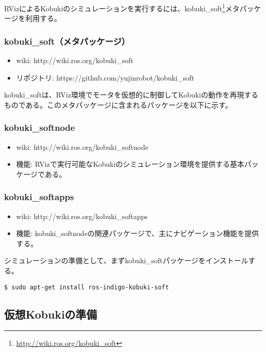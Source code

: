 RVizによるKobukiのシミュレーションを実行するには、kobuki\_soft\footnote{\url{http://wiki.ros.org/kobuki\_soft}}メタパッケージを利用する。

\subsubsection{kobuki\_soft（メタパッケージ）}

\begin{itemize}
\item wiki: http://wiki.ros.org/kobuki\_soft
\item リポジトリ: https://github.com/yujinrobot/kobuki\_soft
\end{itemize}

kobuki\_softは、RViz環境でモータを仮想的に制御してKobukiの動作を再現するものである。このメタパッケージに含まれるパッケージを以下に示す。

\subsubsection{kobuki\_softnode}

\begin{itemize}
\item wiki: http://wiki.ros.org/kobuki\_softnode
\item 機能: RVizで実行可能なKobukiのシミュレーション環境を提供する基本パッケージである。
\end{itemize}

\subsubsection{kobuki\_softapps}

\begin{itemize}
\item wiki: http://wiki.ros.org/kobuki\_softapps
\item 機能: kobuki\_softnodeの関連パッケージで、主にナビゲーション機能を提供する。
\end{itemize}

シミュレーションの準備として、まずkobuki\_softパッケージをインストールする。

\begin{lstlisting}[language=ROS]
$ sudo apt-get install ros-indigo-kobuki-soft
\end{lstlisting}

\subsection{仮想Kobukiの準備}

